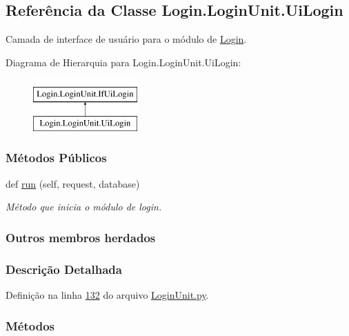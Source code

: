 \hypertarget{classLogin_1_1LoginUnit_1_1UiLogin}{}\subsection{Referência da Classe Login.\+Login\+Unit.\+Ui\+Login}
\label{classLogin_1_1LoginUnit_1_1UiLogin}


Camada de interface de usuário para o módulo de \hyperlink{namespaceLogin}{Login}.  


Diagrama de Hierarquia para Login.\+Login\+Unit.\+Ui\+Login\+:\begin{figure}[H]
\begin{center}
\leavevmode
\includegraphics[height=2.000000cm]{de/da8/classLogin_1_1LoginUnit_1_1UiLogin}
\end{center}
\end{figure}
\subsubsection*{Métodos Públicos}
\begin{DoxyCompactItemize}
\item 
def \hyperlink{classLogin_1_1LoginUnit_1_1UiLogin_a7c474f0e88183b48578c70b1781279ef}{run} (self, request, database)
\begin{DoxyCompactList}\small\item\em Método que inicia o módulo de login. \end{DoxyCompactList}\end{DoxyCompactItemize}
\subsubsection*{Outros membros herdados}


\subsubsection{Descrição Detalhada}


Definição na linha \hyperlink{LoginUnit_8py_source_l00132}{132} do arquivo \hyperlink{LoginUnit_8py_source}{Login\+Unit.\+py}.



\subsubsection{Métodos}
\hypertarget{classLogin_1_1LoginUnit_1_1UiLogin_a7c474f0e88183b48578c70b1781279ef}{}
